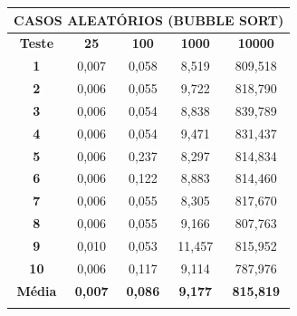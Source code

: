 \documentclass[a4paper, 12pt]{article}
\begin{document}
\begin{minipage}{1.0\textwidth}
 \begin{minipage}[c]{0.49\textwidth}
 \centering
 \begin{tabular}{ccccc}

                   \multicolumn{ 5}{c}{{\bf CASOS ALEATÓRIOS (BUBBLE SORT)}} \\
\hline
{\bf Teste} &  {\bf 25} & {\bf 100} & {\bf 1000} & {\bf 10000} \\
\hline
   {\bf 1} &      0,007 &      0,058 &      8,519 &    809,518 \\
\hline
   {\bf 2} &      0,006 &      0,055 &      9,722 &    818,790 \\
\hline
   {\bf 3} &      0,006 &      0,054 &      8,838 &    839,789 \\
\hline
   {\bf 4} &      0,006 &      0,054 &      9,471 &    831,437 \\
\hline
   {\bf 5} &      0,006 &      0,237 &      8,297 &    814,834 \\
\hline
   {\bf 6} &      0,006 &      0,122 &      8,883 &    814,460 \\
\hline
   {\bf 7} &      0,006 &      0,055 &      8,305 &    817,670 \\
\hline
   {\bf 8} &      0,006 &      0,055 &      9,166 &    807,763 \\
\hline
   {\bf 9} &      0,010 &      0,053 &     11,457 &    815,952 \\
\hline
  {\bf 10} &      0,006 &      0,117 &      9,114 &    787,976 \\
\hline
{\bf Média} & {\bf 0,007} & {\bf 0,086} & {\bf 9,177} & {\bf 815,819} \\
\hline
           &            &            &            &            \\
\end{tabular}
\end{minipage}
\hfill
\begin{minipage}[c]{0.49\textwidth}
\centering
{}
\end{minipage}
\end{minipage}
\end{document}
